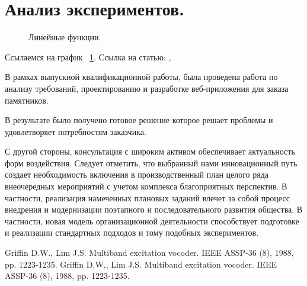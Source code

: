 \documentclass[a4paper,article,14pt]{extarticle}
\begin{document}
\section{Анализ экспериментов.}
\begin{figure}[ht]
\begin{center}

\caption{
\label{graph-fig}
     Линейные функции.}
\end {center}
\end {figure}
Ссылаемся на график ~\ref{graph-fig}.
Ссылка на статью: \cite{voc}, \cite{vo2}

В рамках выпускной квалификационной работы, была проведена работа по анализу требований,
проектированию и разработке веб-приложения для заказа памятников.

В результате было получено готовое решение которое решает проблемы и удовлетворяет потребностям заказчика.
\pagebreak

\pagebreak


С другой стороны, консультация с широким активом обеспечивает актуальность форм воздействия. Следует отметить, что выбранный нами инновационный путь создает необходимость включения в производственный план целого ряда внеочередных мероприятий с учетом комплекса благоприятных перспектив. В частности, реализация намеченных плановых заданий влечет за собой процесс внедрения и модернизации поэтапного и последовательного развития общества. В частности, новая модель организационной деятельности способствует подготовке и реализации стандартных подходов и тому подобных экспериментов.

\begin{thebibliography}{1}
 Griffin D.W., Lim J.S. \flqq Multiband excitation vocoder\frqq. IEEE ASSP-36 (8), 1988, pp. 1223-1235.
 Griffin D.W., Lim J.S. \flqq Multiband excitation vocoder\frqq. IEEE ASSP-36 (8), 1988, pp. 1223-1235.
\end{thebibliography}
\end{document}
